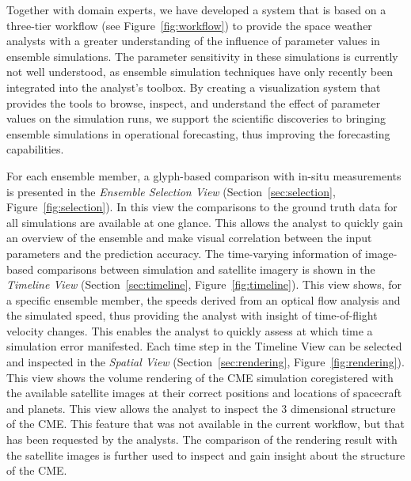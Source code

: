 \documentclass[journal]{vgtc}                %
\begin{document}
Together with domain experts, we have developed a system that is based on a three-tier workflow (see Figure~\ref{fig:workflow}) to provide the space weather analysts with a greater understanding of the influence of parameter values in ensemble simulations. The parameter sensitivity in these simulations is currently not well understood, as ensemble simulation techniques have only recently been integrated into the analyst's toolbox. By creating a visualization system that provides the tools to browse, inspect, and understand the effect of parameter values on the simulation runs, we support the scientific discoveries to bringing ensemble simulations in operational forecasting, thus improving the forecasting capabilities.

For each ensemble member, a glyph-based comparison with in-situ measurements is presented in the \emph{Ensemble Selection View} (Section~\ref{sec:selection}, Figure~\ref{fig:selection}). In this view the comparisons to the ground truth data for all simulations are available at one glance. This allows the analyst to quickly gain an overview of the ensemble and make visual correlation between the input parameters and the prediction accuracy. The time-varying information of image-based comparisons between simulation and satellite imagery is shown in the \emph{Timeline View} (Section~\ref{sec:timeline}, Figure~\ref{fig:timeline}). This view shows, for a specific ensemble member, the speeds derived from an optical flow analysis and the simulated speed, thus providing the analyst with insight of time-of-flight velocity changes. This enables the analyst to quickly assess at which time a simulation error manifested. Each time step in the Timeline View can be selected and inspected in the \emph{Spatial View} (Section~\ref{sec:rendering}, Figure~\ref{fig:rendering}). This view shows the volume rendering of the CME simulation coregistered with the available satellite images at their correct positions and locations of spacecraft and planets. This view allows the analyst to inspect the 3 dimensional structure of the CME. This feature that was not available in the current workflow, but that has been requested by the analysts. The comparison of the rendering result with the satellite images is further used to inspect and gain insight about the structure of the CME.

\end{document}

